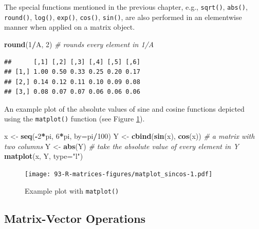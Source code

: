 \documentclass[10pt,b5paper,krantz1]{krantz}
\newenvironment{Shaded}{\begin{snugshade}}{\end{snugshade}}
\newcommand{\CommentTok}[1]{\textcolor[rgb]{0.37,0.37,0.37}{\textit{#1}}}
\newcommand{\DataTypeTok}[1]{\textcolor[rgb]{0.27,0.27,0.27}{#1}}
\newcommand{\DecValTok}[1]{\textcolor[rgb]{0.06,0.06,0.06}{#1}}
\newcommand{\KeywordTok}[1]{\textcolor[rgb]{0.27,0.27,0.27}{\textbf{#1}}}
\newcommand{\NormalTok}[1]{#1}
\newcommand{\OperatorTok}[1]{\textcolor[rgb]{0.43,0.43,0.43}{\textbf{#1}}}
\newcommand{\StringTok}[1]{\textcolor[rgb]{0.5,0.5,0.5}{#1}}
\begin{document}
The special functions mentioned in the previous chapter, e.g.,
\texttt{sqrt()}, \texttt{abs()}, \texttt{round()}, \texttt{log()}, \texttt{exp()}, \texttt{cos()}, \texttt{sin()},
are also performed in an elementwise manner when applied on a matrix object.

\begin{Shaded}
\begin{Highlighting}[]
\KeywordTok{round}\NormalTok{(}\DecValTok{1}\OperatorTok{/}\NormalTok{A, }\DecValTok{2}\NormalTok{) }\CommentTok{# rounds every element in 1/A}
\end{Highlighting}
\end{Shaded}

\begin{verbatim}
##      [,1] [,2] [,3] [,4] [,5] [,6]
## [1,] 1.00 0.50 0.33 0.25 0.20 0.17
## [2,] 0.14 0.12 0.11 0.10 0.09 0.08
## [3,] 0.08 0.07 0.07 0.06 0.06 0.06
\end{verbatim}

An example plot of the absolute values of sine and cosine functions
depicted using the \texttt{matplot()} function (see Figure \ref{fig:matplot_sincos}).

\begin{Shaded}
\begin{Highlighting}[]
\NormalTok{x <-}\StringTok{ }\KeywordTok{seq}\NormalTok{(}\OperatorTok{-}\DecValTok{2}\OperatorTok{*}\NormalTok{pi, }\DecValTok{6}\OperatorTok{*}\NormalTok{pi, }\DataTypeTok{by=}\NormalTok{pi}\OperatorTok{/}\DecValTok{100}\NormalTok{)}
\NormalTok{Y <-}\StringTok{ }\KeywordTok{cbind}\NormalTok{(}\KeywordTok{sin}\NormalTok{(x), }\KeywordTok{cos}\NormalTok{(x)) }\CommentTok{# a matrix with two columns}
\NormalTok{Y <-}\StringTok{ }\KeywordTok{abs}\NormalTok{(Y) }\CommentTok{# take the absolute value of every element in Y}
\KeywordTok{matplot}\NormalTok{(x, Y, }\DataTypeTok{type=}\StringTok{"l"}\NormalTok{)}
\end{Highlighting}
\end{Shaded}

\begin{figure}
\hypertarget{fig:matplot_sincos}{%
\centering
\texttt{[image: 93-R-matrices-figures/matplot\_sincos-1.pdf]}
\caption{Example plot with \texttt{matplot()}}\label{fig:matplot_sincos}
}
\end{figure}

\hypertarget{matrix-vector-operations}{%
\subsection{Matrix-Vector Operations}\label{matrix-vector-operations}}
\end{document}
